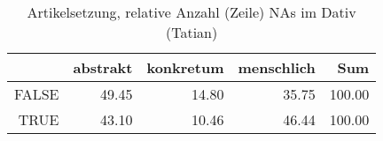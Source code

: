 \begin{table}[ht]
\centering
\begin{tabular}{rrrrr}
  \hline
 & abstrakt & konkretum & menschlich & Sum \\ 
  \hline
FALSE & 49.45 & 14.80 & 35.75 & 100.00 \\ 
  TRUE & 43.10 & 10.46 & 46.44 & 100.00 \\ 
   \hline
\end{tabular}
\caption{Artikelsetzung, relative Anzahl (Zeile) NAs im Dativ (Tatian)} 
\end{table}
